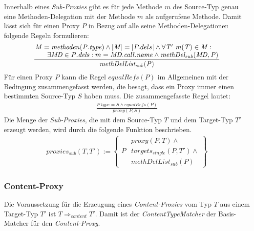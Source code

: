 Innerhalb eines \emph{Sub-Proxies} gibt es für jede Methode $m$ des Source-Typ genau eine Methoden-Delegation mit der Methode $m$ als aufgerufene Methode. Damit lässt sich für einen Proxy $P$ in Bezug auf alle seine Methoden-Delegationen folgende Regeln formulieren:
\begin{gather*}
\frac{\splitfrac{\mathit{M} = \mathit{methoden(P.type)}\wedge|\mathit{M}| = |P.dels| \wedge \forall \mathit{T'\text{ }m(T)} \in \mathit{M}:}{\exists \mathit{MD} \in \mathit{P.dels}:m = \mathit{MD.call.name} \wedge \mathit{methDel_{sub}(MD,P)
 }}
}
{\mathit{methDelList_{sub}(P)}}
\end{gather*}
Für einen Proxy $P$ kann die Regel $\mathit{equalRefs(P)}$ im Allgemeinen mit der Bedingung zusammengefasst werden, die besagt, dass ein Proxy immer einen bestimmten Source-Typ $S$ haben muss. Die zusammengefasste Regel lautet:
\begin{gather*}
\frac{\mathit{P.type} = \mathit{S} \wedge \mathit{equalRefs(P)}}{\mathit{proxy(P,S)}}
\end{gather*}
\noindent
Die Menge der \emph{Sub-Proxies}, die mit dem Source-Typ $T$ und dem Target-Typ $T'$ erzeugt werden, wird durch die folgende Funktion beschrieben.
\begin{gather*}
\mathit{proxies_{sub}(T,T')} := 
\left\{\begin{array}{l|l}
		& \mathit{proxy(P,T)}\wedge \mathit{ } \\
	P	& \mathit{targets_{single}(P,T')} \wedge \mathit{ } \\
		& \mathit{methDelList_{sub}(P)}
		 \end{array}
\right\}
\end{gather*}


\subsubsection{Content-Proxy}
Die Voraussetzung für die Erzeugung eines \emph{Content-Proxies} vom Typ $T$ aus einem Target-Typ $T'$ ist $T \Rightarrow_{content} T'$. Damit ist der \emph{ContentTypeMatcher} der Basis-Matcher für den \emph{Content-Proxy}.
